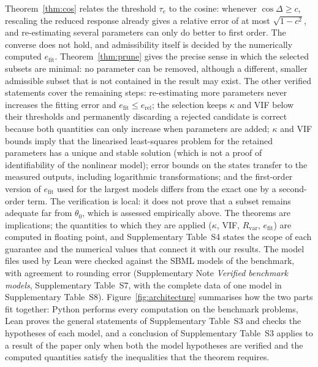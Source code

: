 \documentclass[pdflatex,sn-nature]{sn-jnl}
\theoremstyle{plain}
\begin{document}
Theorem~\ref{thm:cos} relates the threshold $\tau_e$ to the cosine: whenever $\cos\Delta\ge c$, rescaling the reduced response already gives a relative error of at most $\sqrt{1-c^2}$, and re-estimating several parameters can only do better to first order. The converse does not hold, and admissibility itself is decided by the numerically computed $e_{\mathrm{fit}}$. Theorem~\ref{thm:prune} gives the precise sense in which the selected subsets are minimal: no parameter can be removed, although a different, smaller admissible subset that is not contained in the result may exist. The other verified statements cover the remaining steps: re-estimating more parameters never increases the fitting error and $e_{\mathrm{fit}}\le e_{\mathrm{rel}}$; the selection keeps $\kappa$ and VIF below their thresholds and permanently discarding a rejected candidate is correct because both quantities can only increase when parameters are added; $\kappa$ and VIF bounds imply that the linearised least-squares problem for the retained parameters has a unique and stable solution (which is not a proof of identifiability of the nonlinear model); error bounds on the states transfer to the measured outputs, including logarithmic transformations; and the first-order version of $e_{\mathrm{fit}}$ used for the largest models differs from the exact one by a second-order term. The verification is local: it does not prove that a subset remains adequate far from $\theta_0$, which is assessed empirically above. The theorems are implications; the quantities to which they are applied ($\kappa$, VIF, $R_{\mathrm{var}}$, $e_{\mathrm{fit}}$) are computed in floating point, and Supplementary Table~S4 states the scope of each guarantee and the numerical values that connect it with our results. The model files used by Lean were checked against the SBML models of the benchmark, with agreement to rounding error (Supplementary Note \textit{Verified benchmark models}, Supplementary Table~S7, with the complete data of one model in Supplementary Table~S8). Figure~\ref{fig:architecture} summarises how the two parts fit together: Python performs every computation on the benchmark problems, Lean proves the general statements of Supplementary Table~S3 and checks the hypotheses of each model, and a conclusion of Supplementary Table~S3 applies to a result of the paper only when both the model hypotheses are verified and the computed quantities satisfy the inequalities that the theorem requires.
\end{document}

